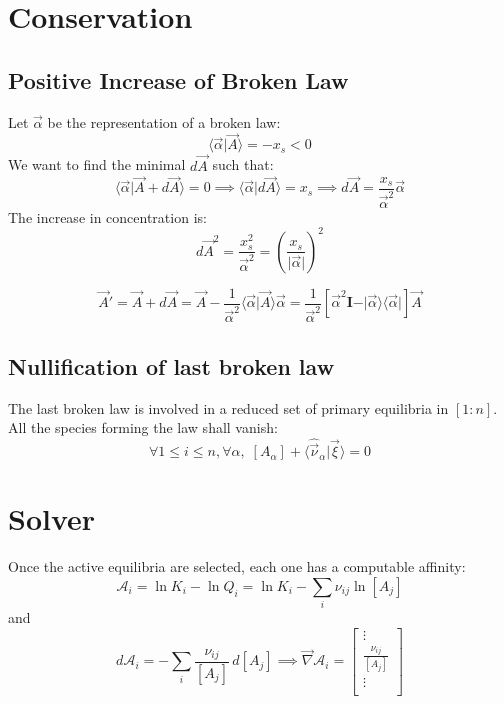 \documentclass[aps,12pt]{revtex4}
\begin{document}
\section{Conservation}

\subsection{Positive Increase of Broken Law}
Let $\vec \alpha$ be the representation of a broken law:
\begin{equation}
	\langle \vec \alpha \vert \vec A \rangle = - x_s < 0
\end{equation}
We want to find the minimal $d \vec A$ such that:
\begin{equation}
	\langle \vec \alpha \vert \vec A + d\vec A \rangle = 0 \implies \langle \vec \alpha \vert d \vec A \rangle = x_s \implies d \vec A = \dfrac{x_s}{\vec\alpha^2} \vec \alpha
\end{equation}
The increase in concentration is:
\begin{equation}
	d \vec A^2 = \dfrac{x_s^2}{\vec \alpha^2} = \left( \dfrac{x_s}{\vert\vec\alpha\vert}\right) ^2
\end{equation}

\begin{equation}
	\vec A ' = \vec A + d \vec A = \vec{A} - \dfrac{1}{\vec \alpha^2} \langle \vec \alpha \vert \vec A \rangle \vec \alpha 
	= \dfrac{1}{\vec \alpha^2} \left[ \vec \alpha^2 \bm I - \vert \vec \alpha \rangle \langle \vec \alpha \vert \right] \vec A
\end{equation}

\subsection{Nullification of last broken law}
The last broken law is involved in a reduced set of primary equilibria in $[1:n]$.
All the species forming the law shall vanish:
\begin{equation}
	\forall 1 \leq i \leq n, \forall \alpha,\; [A_\alpha] + \langle \hat {\vec \nu}_\alpha \vert \vec \xi \rangle = 0 
\end{equation}
 
 		
\section{Solver}

Once the active equilibria are selected, each one has a computable 
affinity:
\begin{equation}
\label{eq:affinity}
	\mathcal A_i = \ln K_i - \ln Q_i = \ln K_i -  \sum_{i} \nu_{ij} \ln [A_j] %
\end{equation}
and
\begin{equation}
	d \mathcal A_i = - \sum_i \dfrac{\nu_{ij}}{[A_j]} \, d[A_j] \implies
	 \vec \nabla \mathcal A_i = 
	\begin{bmatrix}
	\vdots\\
	\frac{\nu_{ij}}{[A_j]}\\
	\vdots\\
	\end{bmatrix}
\end{equation}
\end{document}
